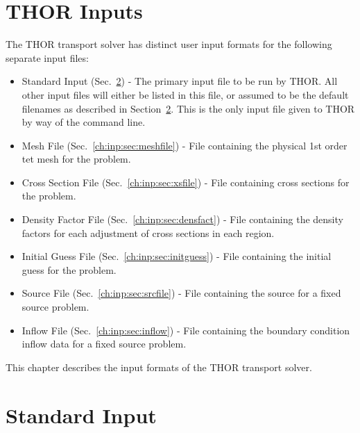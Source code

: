 \section{THOR Inputs}\label{sec:THOR_format}

The THOR transport solver has distinct user input formats for the following separate input files:
\begin{itemize}
    \item Standard Input (Sec.~\ref{ch:inp:sec:stdinput}) - The primary input file to be run by THOR.
    All other input files will either be listed in this file, or assumed to be the default filenames as described in Section~\ref{ch:inp:sec:stdinput}.
    This is the only input file given to THOR by way of the command line.
    \item Mesh File (Sec.~\ref{ch:inp:sec:meshfile}) - File containing the physical 1st order tet mesh for the problem.
    \item Cross Section File (Sec.~\ref{ch:inp:sec:xsfile}) - File containing cross sections for the problem.
    \item Density Factor File (Sec.~\ref{ch:inp:sec:densfact}) - File containing the density factors for each adjustment of cross sections in each region.
    \item Initial Guess File (Sec.~\ref{ch:inp:sec:initguess}) - File containing the initial guess for the problem.
    \item Source File (Sec.~\ref{ch:inp:sec:srcfile}) - File containing the source for a fixed source problem.
    \item Inflow File (Sec.~\ref{ch:inp:sec:inflow}) - File containing the boundary condition inflow data for a fixed source problem.
\end{itemize}

This chapter describes the input formats of the THOR transport solver.

\section{Standard Input}\label{ch:inp:sec:stdinput}

